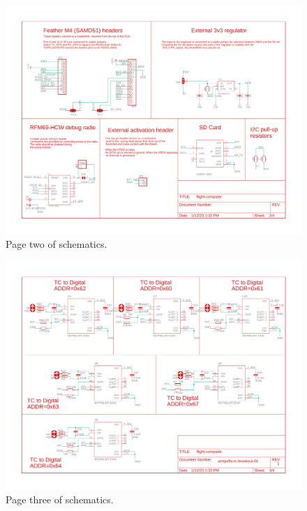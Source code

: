 \documentclass{article}
\begin{document}
\begin{figure}[H]
    \centering
    \includegraphics[width=\textwidth]{images/flight-computer-schematic-page2.pdf}
    \caption{Page two of schematics.}
    \label{fig:page1_1}
\end{figure}

\begin{figure}[H]
    \centering
    \includegraphics[width=\textwidth]{images/flight-computer-schematic-page3.pdf}
    \caption{Page three of schematics.}
    \label{fig:page1-3}
\end{figure}
\end{document}
